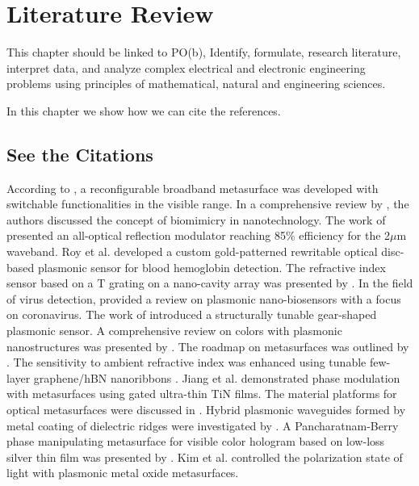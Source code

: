 \chapter{Literature Review}\label{ch:citations}

This chapter should be linked to PO(b), Identify, formulate, research literature, interpret data, and analyze complex electrical and electronic engineering problems using principles of mathematical, natural and engineering sciences.

In this chapter we show how we can cite the references.


\section{See the Citations}
\label{sec:cite}

According to \cite{karim2023reconfigurable}, a reconfigurable broadband metasurface was developed with switchable functionalities in the visible range. In a comprehensive review by \cite{himel2023biomimicry}, the authors discussed the concept of biomimicry in nanotechnology. The work of \cite{bhuiyan2022tin} presented an all-optical reflection modulator reaching 85\% efficiency for the 2$\mu$m waveband. Roy et al. \cite{roy2022custom} developed a custom gold-patterned rewritable optical disc-based plasmonic sensor for blood hemoglobin detection. The refractive index sensor based on a T grating on a nano-cavity array was presented by \cite{abed2021t}. In the field of virus detection, \cite{hassan2021review} provided a review on plasmonic nano-biosensors with a focus on coronavirus. The work of \cite{sarker2020structurally} introduced a structurally tunable gear-shaped plasmonic sensor. A comprehensive review on colors with plasmonic nanostructures was presented by \cite{song2019colors}. The roadmap on metasurfaces was outlined by \cite{quevedo2019roadmap}. The sensitivity to ambient refractive index was enhanced using tunable few-layer graphene/hBN nanoribbons \cite{jiang2019enhancing}. Jiang et al. \cite{jiang2019modulating} demonstrated phase modulation with metasurfaces using gated ultra-thin TiN films. The material platforms for optical metasurfaces were discussed in \cite{choudhury2018material}. Hybrid plasmonic waveguides formed by metal coating of dielectric ridges were investigated by \cite{zenin2017hybrid}. A Pancharatnam-Berry phase manipulating metasurface for visible color hologram based on low-loss silver thin film was presented by \cite{choudhury2017pancharatnam}. Kim et al. \cite{kim2016controlling} controlled the polarization state of light with plasmonic metal oxide metasurfaces.


\endinput



